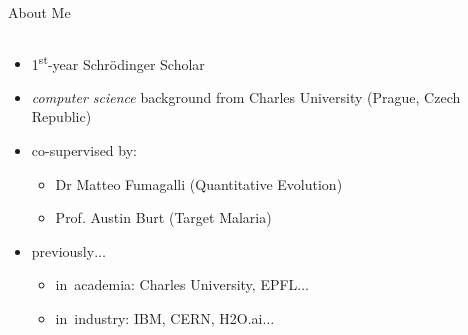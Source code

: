 \documentclass[final,hyperref={pdfpagelabels=false}]{beamer}
\begin{document}
\begin{frame}[t]
\begin{columns}[t]
\begin{column}{.465\textwidth}

\begin{block}{About Me}

\begin{columns} %

\begin{column}{.7\textwidth} %
\begin{itemize}
\item 1\textsuperscript{st}-year Schr\"odinger Scholar
\item \emph{computer science} background from Charles University (Prague, Czech Republic)
    
\item co-supervised by:
    \begin{itemize}
	\item Dr Matteo Fumagalli (Quantitative Evolution)
	\item Prof. Austin Burt (Target Malaria)
    \end{itemize}
    
\item previously$\dots$
    \begin{itemize}
	\item in~academia: Charles University, EPFL$\dots$
	\item in~industry: IBM, CERN, H2O.ai$\dots$
    \end{itemize}
\end{itemize}
\end{column}


\end{columns}
\end{block}
\end{column}
\end{columns}
\end{frame}
\end{document}
